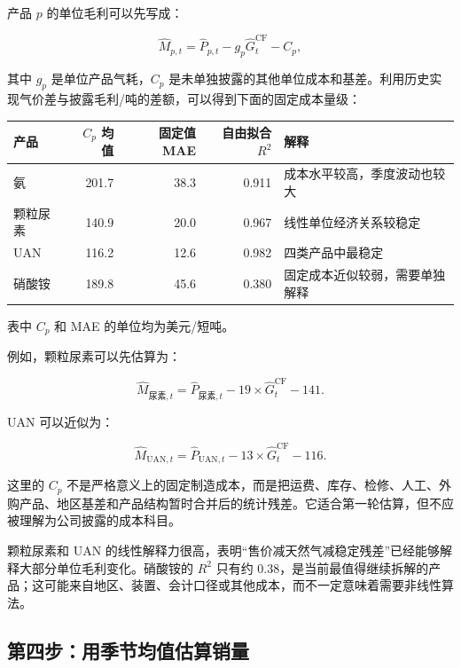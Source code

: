 \documentclass[11pt,a4paper]{ctexart}
\begin{document}
产品 $p$ 的单位毛利可以先写成：

\begin{equation*}
\widehat{M}_{p,t}
=\widehat{P}_{p,t}
-g_p\widehat{G}^{\text{CF}}_t
-C_p,
\end{equation*}

其中 $g_p$ 是单位产品气耗，$C_p$ 是未单独披露的其他单位成本和基差。利用历史实现气价差与披露毛利/吨的差额，可以得到下面的固定成本量级：

\begin{center}
\small
\begin{tabularx}{\textwidth}{L{2.8cm}r r r Y}
\toprule
产品 & $C_p$ 均值 & 固定值 MAE & 自由拟合 $R^2$ & 解释 \\
\midrule
氨 & 201.7 & 38.3 & 0.911 & 成本水平较高，季度波动也较大 \\
颗粒尿素 & 140.9 & 20.0 & 0.967 & 线性单位经济关系较稳定 \\
UAN & 116.2 & 12.6 & 0.982 & 四类产品中最稳定 \\
硝酸铵 & 189.8 & 45.6 & 0.380 & 固定成本近似较弱，需要单独解释 \\
\bottomrule
\end{tabularx}
\normalsize
\end{center}

表中 $C_p$ 和 MAE 的单位均为美元/短吨。

例如，颗粒尿素可以先估算为：

\begin{equation*}
\widehat{M}_{\text{尿素},t}
=\widehat{P}_{\text{尿素},t}
-19\times\widehat{G}^{\text{CF}}_t
-141.
\end{equation*}

UAN 可以近似为：

\begin{equation*}
\widehat{M}_{\text{UAN},t}
=\widehat{P}_{\text{UAN},t}
-13\times\widehat{G}^{\text{CF}}_t
-116.
\end{equation*}

这里的 $C_p$ 不是严格意义上的固定制造成本，而是把运费、库存、检修、人工、外购产品、地区基差和产品结构暂时合并后的统计残差。它适合第一轮估算，但不应被理解为公司披露的成本科目。

颗粒尿素和 UAN 的线性解释力很高，表明“售价减天然气减稳定残差”已经能够解释大部分单位毛利变化。硝酸铵的 $R^2$ 只有约 0.38，是当前最值得继续拆解的产品；这可能来自地区、装置、会计口径或其他成本，而不一定意味着需要非线性算法。

\subsection{第四步：用季节均值估算销量}
\end{document}
